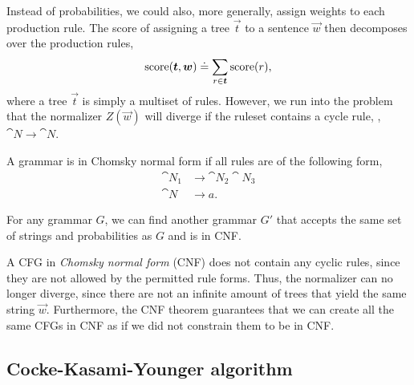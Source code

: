 Instead of probabilities, we could also, more generally, assign weights to each
production rule. The score of assigning a tree $\vec{t}$ to a sentence
$\vec{w}$ then decomposes over the production rules, \[
  \mathrm{score}(\bm{t},\bm{w}) \doteq \sum_{r\in\bm{t}} \mathrm{score}(r)
,\]
where a tree $\vec{t}$ is simply a multiset of rules. However, we run into the
problem that the normalizer $Z(\vec{w})$ will diverge if the ruleset contains a
cycle rule, \eg, $\cat{N}\to\cat{N}$.

\begin{definition}
  A grammar is in Chomsky normal form if all rules are of the following form,
  \begin{align*}
    \cat{N}_1 &\to \cat{N}_2 \cat{N}_3 \\
    \cat{N} &\to a
  .\end{align*}
\end{definition}

\begin{theorem}
  For any grammar $G$, we can find another grammar $G'$ that accepts the same
  set of strings and probabilities as $G$ and is in CNF.
\end{theorem}

A CFG in \textit{Chomsky normal form} (CNF) does not contain any cyclic rules,
since they are not allowed by the permitted rule forms. Thus, the normalizer
can no longer diverge, since there are not an infinite amount of trees that
yield the same string $\vec{w}$. Furthermore, the CNF theorem guarantees that
we can create all the same CFGs in CNF as if we did not constrain them to be in
CNF.

\subsection{Cocke-Kasami-Younger algorithm}

